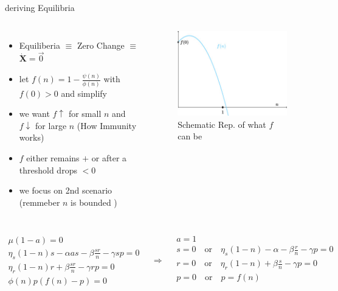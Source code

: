 \documentclass{beamer}
\begin{document}
\begin{frame}[shrink=20]{deriving Equilibria}
  \begin{columns}
      \begin{itemize}
          \item Equiliberia $\equiv$ Zero Change $\equiv$  \( \dot{\mathbf{X}} = \vec{0} \)
          \item let \(f(n) = 1 - \frac{\psi(n)}{\phi(n)}\) with \(f(0)>0\) and simplify
          \item we want \( f \uparrow \) for small \(n\) and \(f \downarrow \) for large \(n\) (How Immunity works)
          \item \(f\) either remains \(+\) or after a threshold drops \(< 0\)
          \item we focus on 2nd scenario (remmeber \( n \) is bounded )
      \end{itemize}
      \begin{figure}
        \includegraphics[width=\textwidth]{1-s2.0-S1007570424005975-gr2.jpg}
        \caption{Schematic Rep. of what \(f\) can be \cite{MOSTEFAOUI2025108412}}
      \end{figure}
  \end{columns}
  \vspace{-5mm}
  \[\begin{array}{l}
    \mu(1 - a)  = 0 \\
    \eta_s(1 - n)s - \alpha as - \beta \frac{sr}{n} - \gamma sp = 0 \\
    \eta_r(1 - n)r + \beta \frac{sr}{n} - \gamma rp = 0 \\
    \phi(n)p(f(n) -p ) = 0 
  \end{array} \quad \Rightarrow \quad \begin{array}{l}
    a = 1 \\
    s = 0 \quad \text{or} \quad \eta_s(1-n) - \alpha - \beta\frac{r}{n} -\gamma p =0 \\
    r = 0 \quad \text{or} \quad \eta_r(1-n) + \beta\frac{s}{n} -\gamma p =0 \\
    p = 0 \quad \text{or} \quad p = f(n) \\
  \end{array} \]
\end{frame}
\end{document}

